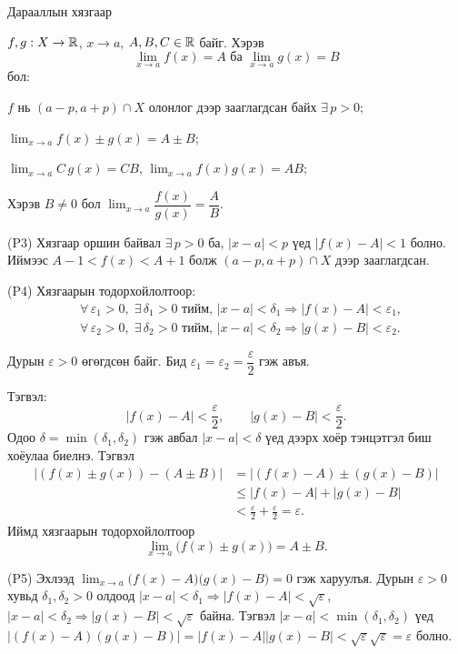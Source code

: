 \begin{frame}[allowframebreaks]{Дарааллын хязгаар}
\begin{theorem}\label{aritlim}
$f,g:X\to\mathbb{R}$, $x\to a$, $A,B,C\in\mathbb{R}$ байг. Хэрэв $$\displaystyle\lim_{x\to a} f(x)=A \text{ ба } \displaystyle\lim_{x\to a} g(x)=B$$ бол:
\begin{description}[leftmargin=2em]
  \item[(P3)] $f$ нь $(a-p,a+p)\cap X$ олонлог дээр зааглагдсан байх  $\exists\,p>0$;
  \item[(P4)] $\displaystyle\lim_{x\to a}f(x)\pm g(x)=A\pm B$;
  \item[(P5)] $\displaystyle\lim_{x\to a} C\,g(x)=CB$, \quad $\displaystyle\lim_{x\to a} f(x)g(x)=AB$;
  \item[(P6)] Хэрэв $B\neq 0$ бол $\displaystyle\lim_{x\to a}\dfrac{f(x)}{g(x)}=\dfrac{A}{B}$.
\end{description}
\end{theorem}

\begin{prof}
(P3) Хязгаар оршин байвал $\exists\,p>0$ ба, $|x-a|<p$ үед $|f(x)-A|<1$ болно. Иймээс $A-1<f(x)<A+1$ болж $(a-p,a+p)\cap X$ дээр зааглагдсан.

(P4) Хязгаарын тодорхойлолтоор:
\begin{align*}
&\forall\,\varepsilon_1>0,\;\exists\,\delta_1>0\text{ тийм, }|x-a|<\delta_1\Rightarrow |f(x)-A|<\varepsilon_1,\\
&\forall\,\varepsilon_2>0,\;\exists\,\delta_2>0\text{ тийм, }|x-a|<\delta_2\Rightarrow |g(x)-B|<\varepsilon_2.
\end{align*}

Дурын $\varepsilon>0$ өгөгдсөн байг.  
Бид $\varepsilon_1=\varepsilon_2=\dfrac{\varepsilon}{2}$ гэж авъя.

Тэгвэл:
\[
|f(x)-A|<\frac{\varepsilon}{2},\qquad |g(x)-B|<\frac{\varepsilon}{2}.
\]
Одоо $\delta=\min(\delta_1,\delta_2)$ гэж авбал $|x-a|<\delta$ үед дээрх хоёр тэнцэтгэл биш хоёулаа биелнэ.  
Тэгвэл
\begin{align*}
|(f(x)\pm g(x))-(A\pm B)|
&=|(f(x)-A)\pm(g(x)-B)|\\
&\le |f(x)-A|+|g(x)-B|\\
&<\frac{\varepsilon}{2}+\frac{\varepsilon}{2}=\varepsilon.
\end{align*}
Иймд хязгаарын тодорхойлолтоор
\[
\lim_{x\to a}\bigl(f(x)\pm g(x)\bigr)=A\pm B.
\]

(P5) Эхлээд $\displaystyle\lim_{x\to a}\bigl(f(x)-A\bigr)\bigl(g(x)-B\bigr)=0$ гэж харуулъя. Дурын $\varepsilon>0$ хувьд $\delta_1,\delta_2>0$ олдоод $|x-a|<\delta_1\Rightarrow |f(x)-A|<\sqrt{\varepsilon}$, $|x-a|<\delta_2\Rightarrow |g(x)-B|<\sqrt{\varepsilon}$ байна. Тэгвэл $|x-a|<\min(\delta_1,\delta_2)$ үед 
$|(f(x)-A)(g(x)-B)|=|f(x)-A||g(x)-B|<\sqrt{\varepsilon}\sqrt{\varepsilon}=\varepsilon$ болно.


\end{prof}
\end{frame}
